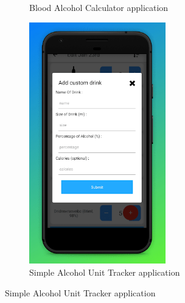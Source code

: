 \begin{figure}[H]
\begin{subfigure}{0.38\textwidth}
      \caption{Blood Alcohol Calculator \cite{alcoholcalculator} application}
      \label{alcoholcalculator}
  \end{subfigure}
  \begin{subfigure}{0.3\textwidth}
      \centering
      \includegraphics[width=0.65\textwidth]{./img/saut.png}
      \caption{Simple Alcohol Unit Tracker \cite{saut} application}
      \label{saut}
  \end{subfigure}



\end{figure}
